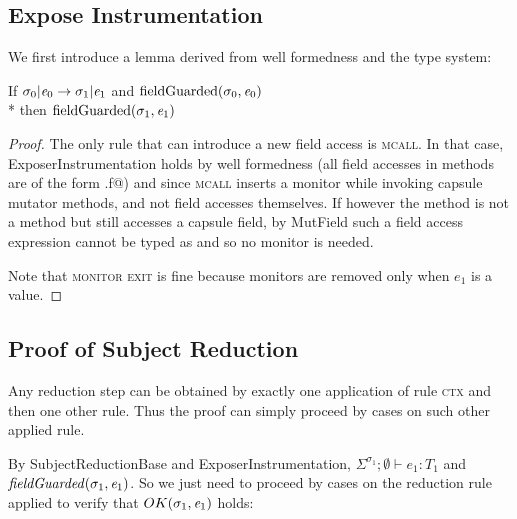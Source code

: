 \subsection{Expose Instrumentation}
We first introduce a lemma derived from well formedness and the type system:
\begin{Lemma}[ExposerInstrumentation]
If $\sigma_0 | \e_0\rightarrow \sigma_1 |\e_1$ and
$\text{fieldGuarded}(\sigma_0,\e_0)$
\\*
then $\text{fieldGuarded}(\sigma_1,\e_1)$
\end{Lemma}
\begin{proof}
The only rule that can
introduce a new field access is \textsc{mcall}.
In that case, ExposerInstrumentation holds
by well formedness (all field accesses in methods are of the form \Q@this.f@)
and since \textsc{mcall} inserts a monitor while invoking capsule mutator methods, and not field accesses themselves. If however the method is not a \Q@mut@ method but still accesses a capsule field, by MutField such a field access expression cannot be typed as \Q@mut@ and so no monitor is needed.

Note that \textsc{monitor exit} is fine because monitors are removed only when
 $e_1$ is a value.
\end{proof}

\subsection{Proof of Subject Reduction}
Any reduction step can be obtained
by exactly one application of rule \textsc{ctx} and then one other rule. Thus the proof can simply proceed by cases on such other applied rule.

By SubjectReductionBase and ExposerInstrumentation,
$\Sigma^{\sigma_1};\emptyset\vdash e_1: T_1$ and  $\mathit{fieldGuarded}(\sigma_1,\e_1)$. So we just need to proceed by cases on the reduction rule applied to verify that $OK(\sigma_1,\e_1)$ holds:


